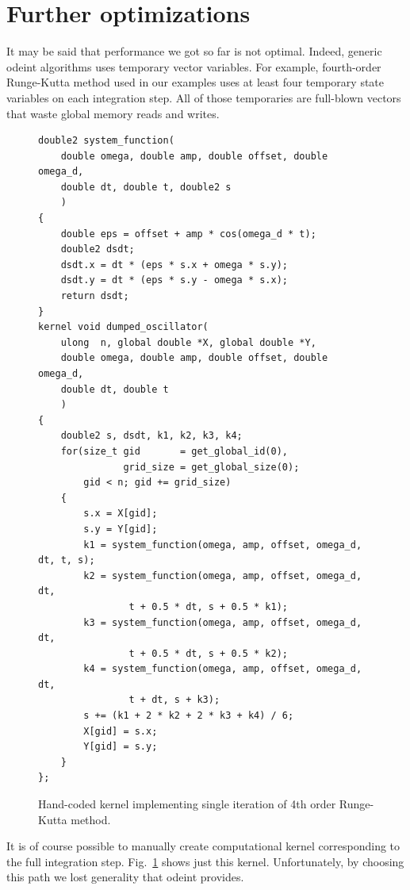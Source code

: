 \documentclass[1p]{elsarticle}
\newcommand{\figref}[1]{Fig.~\ref{#1}}
\begin{document}
\section{Further optimizations}

It may be said that performance we got so far is not optimal. Indeed, generic
odeint algorithms uses temporary vector variables. For example, fourth-order
Runge-Kutta method used in our examples uses at least four temporary state
variables on each integration step. All of those temporaries are full-blown
vectors that waste global memory reads and writes. 

\begin{figure}[p]
\begin{lstlisting}
double2 system_function(
    double omega, double amp, double offset, double omega_d,
    double dt, double t, double2 s
    )
{
    double eps = offset + amp * cos(omega_d * t);
    double2 dsdt;
    dsdt.x = dt * (eps * s.x + omega * s.y);
    dsdt.y = dt * (eps * s.y - omega * s.x);
    return dsdt;
}
kernel void dumped_oscillator(
    ulong  n, global double *X, global double *Y,
    double omega, double amp, double offset, double omega_d,
    double dt, double t
    )
{
    double2 s, dsdt, k1, k2, k3, k4;
    for(size_t gid       = get_global_id(0),
               grid_size = get_global_size(0);
        gid < n; gid += grid_size)
    {
        s.x = X[gid];
        s.y = Y[gid];
        k1 = system_function(omega, amp, offset, omega_d, dt, t, s);
        k2 = system_function(omega, amp, offset, omega_d, dt,
                t + 0.5 * dt, s + 0.5 * k1);
        k3 = system_function(omega, amp, offset, omega_d, dt,
                t + 0.5 * dt, s + 0.5 * k2);
        k4 = system_function(omega, amp, offset, omega_d, dt,
                t + dt, s + k3);
        s += (k1 + 2 * k2 + 2 * k3 + k4) / 6;
        X[gid] = s.x;
        Y[gid] = s.y;
    }
};

\end{lstlisting}
\caption{Hand-coded kernel implementing single iteration of 4th order
Runge-Kutta method.}
\label{code:customkrn}
\end{figure}

It is of course possible to manually create computational kernel corresponding
to the full integration step. \figref{code:customkrn} shows just this
kernel. Unfortunately, by choosing this path we lost generality that odeint
provides.
\end{document}
